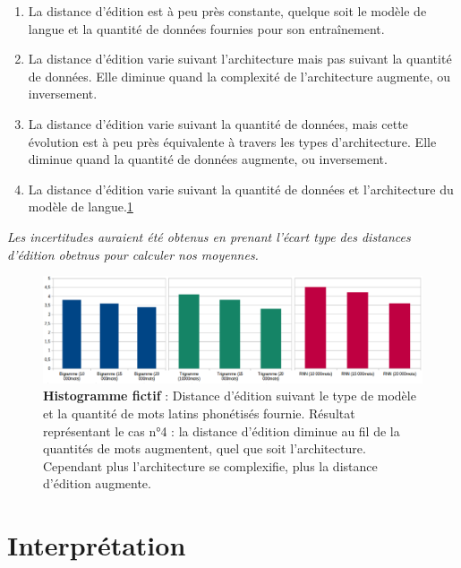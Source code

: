 \documentclass[10pt, french]{article}
\begin{document}
\begin{multicols*}{2}
\begin{enumerate}
    \item La distance d'édition est à peu près constante, quelque soit le modèle de langue et la quantité de données fournies pour son entraînement.
    \item La distance d'édition varie suivant l'architecture mais pas suivant la quantité de données. Elle diminue quand la complexité de l'architecture augmente, ou inversement.
    \item La distance d'édition varie suivant la quantité de données, mais cette évolution est à peu près équivalente à travers les types d'architecture. Elle diminue quand la quantité de données augmente, ou inversement.
    \item La distance d'édition varie suivant la quantité de données et l'architecture du modèle de langue.\ref{fig:figres}
\end{enumerate}

\noindent\textit{Les incertitudes auraient été obtenus en prenant l'écart type des distances d'édition obetnus pour calculer nos moyennes.}

\begin{figure}[ht]
  \centering
  \includegraphics[width=\textwidth]{edit_distance_by_model.png}
  \caption{\textbf{Histogramme fictif} : Distance d'édition suivant le type de modèle et la quantité de mots latins phonétisés fournie. Résultat représentant le cas n°4 : la distance d'édition diminue au fil de la quantités de mots augmentent, quel que soit l'architecture. Cependant plus l'architecture se complexifie, plus la distance d'édition augmente.}
  \label{fig:figres}
\end{figure}


\section{Interprétation}


\end{multicols*}
\end{document}
